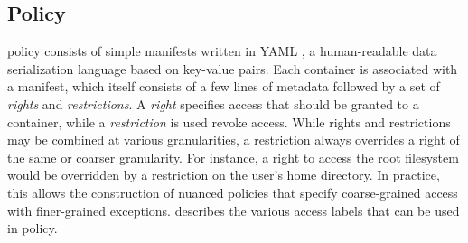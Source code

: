 \subsection{\bpfcontain{} Policy}
\label{sub:policy}

\bpfcontain{} policy consists of simple manifests written in YAML \cite{yaml}, a human-readable data serialization language based on key-value pairs.  Each \bpfcontain{} container is associated with a manifest, which itself consists of a few lines of metadata followed by a set of \textit{rights} and \textit{restrictions}.  A \textit{right} specifies access that should be granted to a container, while a \textit{restriction} is used revoke access. While rights and restrictions may be combined at various granularities, a restriction always overrides a right of the same or coarser granularity. For instance, a right to access the root filesystem would be overridden by a restriction on the user's home directory. In practice, this allows the construction of nuanced policies that specify coarse-grained access with finer-grained exceptions.   describes the various access labels that can be used in \bpfcontain{} policy.

